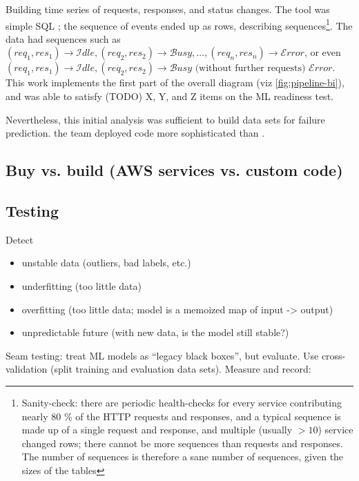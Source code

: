 \documentclass[10 pt, twocolumn]{article}
\begin{document}
Building time series of requests, responses, and status changes. The tool was simple SQL ; the sequence of events ended up as  rows, describing  sequences\footnote{Sanity-check: there are periodic health-checks for every service contributing nearly 80 \% of the HTTP requests and responses, and a typical sequence is made up of a single request and response, and multiple (usually $> 10$) service changed rows; there cannot be more sequences than requests and responses. The  number of sequences is therefore a sane number of sequences, given the sizes of the tables}. The data had sequences such as $(req_1, res_1) \rightarrow \mathcal{I}dle, (req_2, res_2) \rightarrow \mathcal{B}usy, \ldots, (req_n, res_n) \rightarrow \mathcal{E}rror$, or even $(req_1, res_1) \rightarrow \mathcal{I}dle, (req_2, res_2) \rightarrow \mathcal{B}usy\text{ (without further requests) } \mathcal{E}rror$. This work implements the first part of the overall diagram (viz \autoref{fig:pipeline-bi}), and was able to satisfy (TODO) X, Y, and Z items on the ML readiness test.


Nevertheless, this initial analysis was sufficient to build data sets for failure prediction.  the team deployed code more sophisticated than .

\subsection{Buy vs. build (AWS services vs. custom code)}


\subsection{Testing}
Detect
\begin{itemize}
  \item unstable data (outliers, bad labels, etc.)
  \item underfitting (too little data)
  \item overfitting (too little data; model is a memoized map of input -> output)
  \item unpredictable future (with new data, is the model still stable?)
\end{itemize}

Seam testing: treat ML models as ``legacy black boxes'', but evaluate. Use cross-validation (split training and evaluation data sets). Measure and record:
\end{document}
